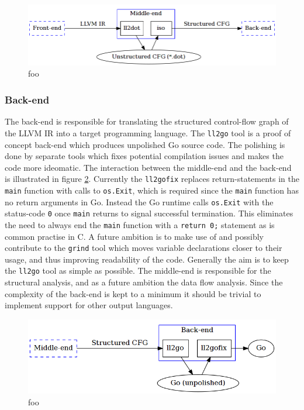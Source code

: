 \documentclass[12pt, a4paper]{article}
\begin{document}
\begin{figure}[htbp]
	\begin{center}
		\includegraphics[width=\textwidth]{inc/middle-end.png}
		\caption{foo}
		\label{middle_end}
	\end{center}
\end{figure}

\subsubsection{Back-end}



The back-end is responsible for translating the structured control-flow graph of the LLVM IR into a target programming language. The \texttt{ll2go} tool is a proof of concept back-end which produces unpolished Go source code. The polishing is done by separate tools which fixes potential compilation issues and makes the code more ideomatic. The interaction between the middle-end and the back-end is illustrated in figure \ref{back_end}. Currently the \texttt{ll2gofix} replaces return-statements in the \texttt{main} function with calls to \texttt{os.Exit}, which is required since the \texttt{main} function has no return arguments in Go. Instead the Go runtime calls \texttt{os.Exit} with the status-code \texttt{0} once \texttt{main} returns to signal successful termination. This eliminates the need to always end the \texttt{main} function with a \texttt{return 0;} statement as is common practise in C. A future ambition is to make use of and possibly contribute to the \texttt{grind} tool which moves variable declarations closer to their usage, and thus improving readability of the code. Generally the aim is to keep the \texttt{ll2go} tool as simple as possible. The middle-end is responsible for the structural analysis, and as a future ambition the data flow analysis. Since the complexity of the back-end is kept to a minimum it should be trivial to implement support for other output languages.

\begin{figure}[htbp]
	\begin{center}
		\includegraphics[width=\textwidth]{inc/back-end.png}
		\caption{foo}
		\label{back_end}
	\end{center}
\end{figure}
\end{document}

